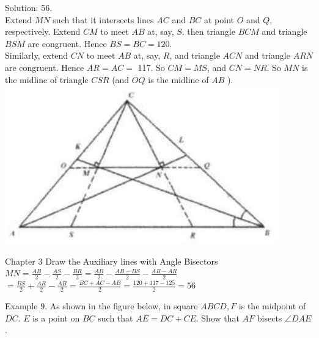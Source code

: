 \documentclass[10pt]{article}
\begin{document}
Solution: 56.\\
Extend \(M N\) such that it intersects lines \(A C\) and \(B C\) at point \(O\) and \(Q\), respectively. Extend \(C M\) to meet \(A B\) at, say, \(S\). then triangle \(B C M\) and triangle \(B S M\) are congruent. Hence \(B S=B C=120\).\\
Similarly, extend \(C N\) to meet \(A B\) at, say, \(R\), and triangle \(A C N\) and triangle \(A R N\) are congruent. Hence \(A R=A C=\) 117. So \(C M=M S\), and \(C N=N R\). So \(M N\) is the midline of triangle \(C S R\) (and \(O Q\) is the midline of \(A B\) ).\\
\includegraphics[max width=\textwidth, center]{2025_04_17_97bc1f7e44d93c271a88g-059}

Chapter 3 Draw the Auxiliary lines with Angle Bisectors\\
\(M N=\frac{A B}{2}-\frac{A S}{2}-\frac{B R}{2}=\frac{A B}{2}-\frac{A B-B S}{2}-\frac{A B-A R}{2}\)\\
\(=\frac{B S}{2}+\frac{A R}{2}-\frac{A B}{2}=\frac{B C+A C-A B}{2}=\frac{120+117-125}{2}=56\)

Example 9. As shown in the figure below, in square \(A B C D, F\) is the midpoint of \(D C\). \(E\) is a point on \(B C\) such that \(A E=D C+C E\). Show that \(A F\) bisects \(\angle D A E\).
\end{document}

